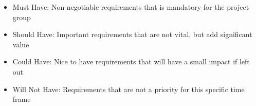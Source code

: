 


\begin{itemize}[label={}]
\setlength{\itemsep}{0.05\baselineskip}
    \item {} \normalsize Must Have: \hspace{5mm} Non-negotiable requirements that is mandatory for the project group \par
    \item {} \normalsize Should Have: \hspace{1.8mm} Important requirements that are not vital, but add significant value \par
    \item {} \normalsize Could Have: \hspace{3.5mm} Nice to have requirements that will have a small impact if left out \par
    \item {} \normalsize Will Not Have: Requirements that are not a priority for this specific time frame \par
\end{itemize}

\vspace{4mm}

